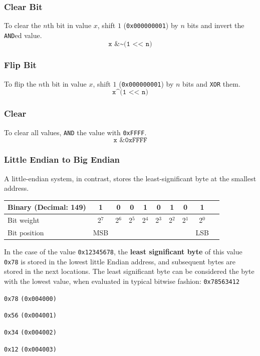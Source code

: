 \documentclass[11pt]{article}
\begin{document}
\subsubsection{Clear Bit}
To clear the $n$th bit in value $x$, shift $1$ (\texttt{0x000000001}) by $n$ bits and invert the \texttt{AND}ed value.
$$\texttt{x \& \textasciitilde(1 << n)}$$
\subsubsection{Flip Bit}
To flip the $n$th bit in value $x$, shift $1$ (\texttt{0x000000001}) by $n$ bits and \texttt{XOR} them.
$$\texttt{x\textasciicircum  (1 << n)}$$
\subsubsection{Clear}
To clear all values, \texttt{AND} the value with \texttt{0xFFFF}.
$$\texttt{x \&  0xFFFF}$$
\subsubsection{Little Endian to Big Endian}
A little-endian system, in contrast, stores the least-significant byte at the smallest address.

\begin{center}
    \begin{tabular}{ | l | c | c | c | c | c | c | c | c | c | } 
    \hline
    Binary (Decimal: 149) & 1 & 0 & 0 & 1 & 0 & 1 & 0 & 1 \\ 
    \hline
    Bit weight & 2$^7$ & 2$^6$ & 2$^5$ & 2$^4$ & 2$^3$ & 2$^2$ & 2$^1$ & 2$^0$ \\ 
    \hline
    Bit position & MSB & & & & & & & LSB \\ 
    \hline
    \end{tabular}
    \end{center}

In the case of the value \texttt{0x12345678}, the \textbf{least significant byte} of this value \texttt{0x78} is stored in the lowest little Endian address, and subsequent bytes are stored in the next locations. The least significant byte can be considered the byte with the lowest value, when evaluated in typical bitwise fashion: \texttt{0x78563412}

\begin{list}{}{}
    \item \texttt{0x78} \texttt{(0x004000)}
    \item \texttt{0x56} \texttt{(0x004001)}
    \item \texttt{0x34} \texttt{(0x004002)}
    \item \texttt{0x12} \texttt{(0x004003)}
\end{list}
\end{document}
